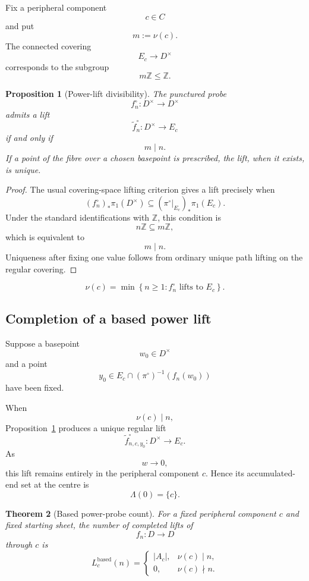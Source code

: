 \documentclass[11pt]{article}
\theoremstyle{plain}
\newtheorem{theorem}{Theorem}[section]
\newtheorem{proposition}[theorem]{Proposition}
\theoremstyle{definition}
\begin{document}
Fix a peripheral component
\[
c\in C
\]
and put
\[
m:=\nu(c).
\]
The connected covering
\[
E_c\longrightarrow D^\times
\]
corresponds to the subgroup
\[
m\mathbb Z
\leq
\mathbb Z.
\]

\begin{proposition}[Power-lift divisibility]
\label{prop:power-lift-divisibility}
The punctured probe
\[
f_n^\circ:D^\times\to D^\times
\]
admits a lift
\[
\widetilde f_n^\circ:
D^\times\longrightarrow E_c
\]
if and only if
\[
m\mid n.
\]
If a point of the fibre over a chosen basepoint is prescribed, the lift,
when it exists, is unique.
\end{proposition}

\begin{proof}
The usual covering-space lifting criterion gives a lift precisely when
\[
(f_n^\circ)_*
\pi_1(D^\times)
\subseteq
(\pi^\circ|_{E_c})_*
\pi_1(E_c).
\]
Under the standard identifications with $\mathbb Z$, this condition is
\[
n\mathbb Z
\subseteq
m\mathbb Z,
\]
which is equivalent to
\[
m\mid n.
\]
Uniqueness after fixing one value follows from ordinary unique path
lifting on the regular covering.
\end{proof}

\[
\nu(c)
=
\min
\left\{
n\geq1:
f_n^\circ
\text{ lifts to }E_c
\right\}.
\]

\subsection{Completion of a based power lift}
\label{subsec:based-power-lifts}

Suppose a basepoint
\[
w_0\in D^\times
\]
and a point
\[
y_0\in E_c
\cap
(\pi^\circ)^{-1}(f_n(w_0))
\]
have been fixed.

When
\[
\nu(c)\mid n,
\]
Proposition~\ref{prop:power-lift-divisibility} produces a unique regular
lift
\[
\widetilde f_{n,c,y_0}^\circ:D^\times\to E_c.
\]
As
\[
w\to0,
\]
this lift remains entirely in the peripheral component $c$.  Hence its
accumulated-end set at the centre is
\[
\Lambda(0)=\{c\}.
\]

\begin{theorem}[Based power-probe count]
\label{thm:based-power-probe-count}
For a fixed peripheral component $c$ and fixed starting sheet,
the number of completed lifts of
\[
f_n:D\to D
\]
through $c$ is
\[
L_c^{\mathrm{based}}(n)
=
\begin{cases}
|A_c|,
&
\nu(c)\mid n,
\\[1mm]
0,
&
\nu(c)\nmid n.
\end{cases}
\]
\end{theorem}
\end{document}
